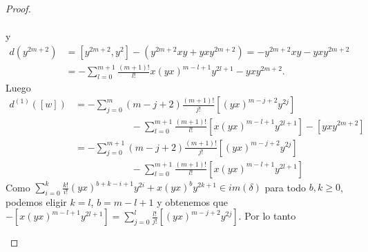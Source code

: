 \documentclass[a4paper,oneside,fleqn,11pt]{article}
\numberwithin{prop}{subsection}
\begin{document}
\begin{proof}
\begin{itemize}
\begin{align*}
			\end{align*}
			y
			\begin{align*}
				d(y^{2m + 2}) &= \left[y^{2m + 2}, y^2\right] - (y^{2m +2}xy + yxy^{2m + 2}) = - y^{2m +2}xy - yxy^{2m + 2} \\
				&= -\sum_{l = 0}^{m + 1}\frac{(m + 1)!}{l!}x(yx)^{m - l + 1}y^{2l + 1} - yxy^{2m + 2}.
			\end{align*}
			Luego
			\begin{align*}
				d^{(1)}(\left[w\right]) &=
					-\sum_{j = 0}^m(m - j + 2)\frac{(m + 1)!}{j!}\left[(yx)^{m -j + 2}y^{2j}\right]\\
				&\hspace{70pt}-\sum_{l = 0}^{m + 1}\frac{(m + 1)!}{l!}\left[x(yx)^{m - l + 1}y^{2l + 1}\right]
						- \left[yxy^{2m + 2}\right]\\
				&= -\sum_{j = 0}^{m + 1}(m - j + 2)\frac{(m + 1)!}{j!}\left[(yx)^{m -j + 2}y^{2j}\right]\\
				& \hspace{70pt}-\sum_{l = 0}^{m + 1}\frac{(m + 1)!}{l!}\left[x(yx)^{m - l + 1}y^{2l + 1}\right]			
			\end{align*}
			Como $\sum_{i = 0}^k\frac{k!}{i!}(yx)^{b + k - i + 1}y^{2i} + x(yx)^by^{2k + 1} \in im(\delta)$
			para todo $b,k \geq 0$, podemos eligir $k = l$, $b = m - l + 1$ y obtenemos que
				$-\left[x(yx)^{m - l + 1}y^{2l + 1}\right]
					= \sum_{j = 0}^l\frac{l!}{j!}\left[(yx)^{m - j + 2}y^{2j}\right].$
			Por lo tanto
			

\end{itemize}
\end{proof}
\end{document}
